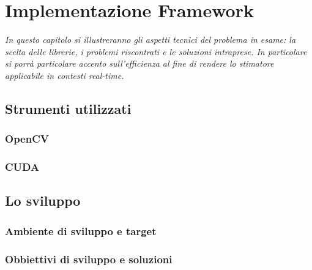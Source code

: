 \chapter{Implementazione Framework}
\label{chap:impl}

\begin{minipage}{12cm}\textit{In questo capitolo si illustreranno gli aspetti tecnici del problema in esame: la scelta delle librerie, i problemi riscontrati e le soluzioni intraprese. In particolare si porrà particolare accento sull'efficienza al fine di rendere lo stimatore applicabile in contesti real-time.}
\end{minipage}

\vspace*{1cm}

\section{Strumenti utilizzati}
\label{sec:tools}


\subsection{OpenCV}
\label{sec:tools:opencv}

\subsection{CUDA}
\label{sec:tools:cuda}



\section{Lo sviluppo}
\label{sec:sviluppo}

\subsection{Ambiente di sviluppo e target}
\label{sec:dev:ambiente}

\subsection{Obbiettivi di sviluppo e soluzioni}
\label{sec:dev:obj}


